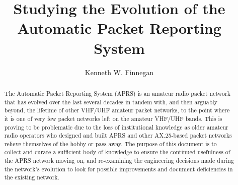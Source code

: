 \documentclass{ucthesis}
\begin{document}
\title{Studying the Evolution of the \\
Automatic Packet Reporting System}
\author{Kenneth W. Finnegan}
  
 
  
 
 
\maketitle

\begin{frontmatter}

\copyrightpage
\committeemembershippage

\begin{abstract}
The Automatic Packet Reporting System (APRS) is an amateur radio packet 
network that has evolved over the last several decades in tandem with, 
and then arguably beyond, the lifetime of other VHF/UHF amateur packet
networks, to the point where it is one of very few packet networks left
on the amateur VHF/UHF bands. This is proving to be problematic due to
the loss of institutional knowledge as older amateur radio operators who
designed and built APRS and other AX.25-based packet networks relieve 
themselves of the hobby or pass away. The purpose of this document is to 
collect and curate a sufficient body of knowledge to ensure the 
continued usefulness of the APRS network moving on, and re-examining 
the engineering decisions made during the network's evolution to look for
possible improvements and document deficiencies in the existing network.
\end{abstract}

\tableofcontents
\listoffigures
\end{frontmatter}








\begin{appendices}


\end{appendices}


\end{document}
